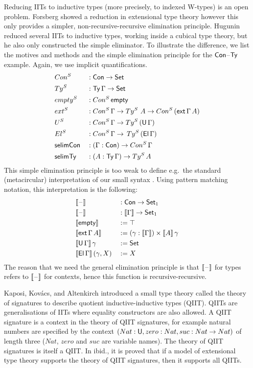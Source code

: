 \documentclass[a4paper,UKenglish,cleveref, autoref]{lipics-v2019}
\begin{document}
Reducing IITs to inductive types (more precisely, to indexed W-types)
is an open problem. Forsberg \cite{forsberg-phd} showed a reduction in
extensional type theory however this only provides a simpler,
non-recursive-recursive elimination principle. Hugunin \cite{jasper}
reduced several IITs to inductive types, working inside a cubical type
theory, but he also only constructed the simple eliminator. To
illustrate the difference, we list the motives and methods and the
simple elimination principle for the $\mathsf{Con}$--$\mathsf{Ty}$ example. Again, we
use implicit quantifications.
\begin{alignat*}{5}
  & Con^S && : \mathsf{Con}\rightarrow\mathsf{Set} \\
  & Ty^S && : \mathsf{Ty}\,\Gamma\rightarrow\mathsf{Set} \\
  & {empty}^S && : Con^S\,\mathsf{empty} \\
  & {ext}^S && : Con^S\,\Gamma\rightarrow Ty^S\,\,A\rightarrow Con^S\,(\mathsf{ext}\,\Gamma\,A) \\
  & U^S && : Con^S\,\Gamma\rightarrow Ty^S\,(\mathsf{U}\,\Gamma) \\
  & El^S && : Con^S\,\Gamma\rightarrow\,Ty^S\,(\mathsf{El}\,\Gamma) \\
  & \mathsf{selimCon} && : (\Gamma:\mathsf{Con})\rightarrow Con^S\,\Gamma \\
  & \mathsf{selimTy} && : (A:\mathsf{Ty}\,\Gamma)\rightarrow Ty^S\,A
\end{alignat*}
This simple elimination principle is too weak to define e.g.\ the
standard (metacircular) interpretation of our small syntax
\cite{ttintt}. Using pattern matching notation, this interpretation is
the following:
\begin{alignat*}{5}
  & \llbracket\mathord{\hspace{1pt}\text{--}\hspace{1pt}}\rrbracket && : \mathsf{Con}\rightarrow\mathsf{Set}_1 \\
  & \llbracket\mathord{\hspace{1pt}\text{--}\hspace{1pt}}\rrbracket && : \llbracket\Gamma\rrbracket\rightarrow\mathsf{Set}_1 \\
  & \llbracket\mathsf{empty}\rrbracket && := \top \\
  & \llbracket\mathsf{ext}\,\Gamma\,A\rrbracket && := (\gamma:\llbracket\Gamma\rrbracket)\times\llbracket A\rrbracket\,\gamma \\
  & \llbracket\mathsf{U}\,\Gamma\rrbracket\,\gamma && := \mathsf{Set} \\
  & \llbracket\mathsf{El}\,\Gamma\rrbracket\,(\gamma,X) && := X
\end{alignat*}
The reason that we need the general elimination principle is that
$\llbracket\mathord{\hspace{1pt}\text{--}\hspace{1pt}}\rrbracket$ for types refers to $\llbracket\mathord{\hspace{1pt}\text{--}\hspace{1pt}}\rrbracket$ for contexts, hence
this function is recursive-recursive.

Kaposi, Kov{\'a}cs, and Altenkirch
\cite{Kaposi:2019:CQI:3302515.3290315} introduced a small type theory
called the theory of signatures to describe quotient
inductive-inductive types (QIIT). QIITs are generalisations of IITs
where equality constructors are also allowed. A QIIT signature is a
context in the theory of QIIT signatures, for example natural numbers
are specified by the context $(Nat:\mathsf{U},zero:Nat,suc:Nat\rightarrow Nat)$ of
length three ($Nat$, $zero$ and $suc$ are variable names). The theory
of QIIT signatures is itself a QIIT. In ibid., it is proved that if a
model of extensional type theory supports the theory of QIIT
signatures, then it supports all QIITs.
\end{document}
